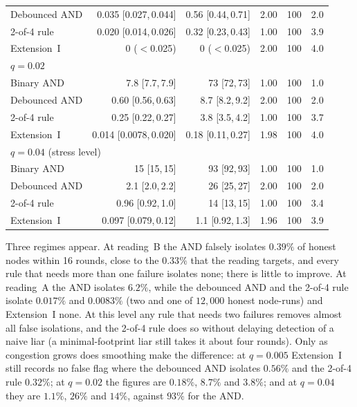 \documentclass[lineno,pdflatex,sn-nature]{sn-jnl}
\theoremstyle{thmstyleone}%
\theoremstyle{thmstylethree}%
\begin{document}
\begin{table}[!t]
\begin{tabular}{lrrrrr}
Debounced AND & 0.035 [0.027,\,0.044] & 0.56 [0.44,\,0.71] & 2.00 & 100 & 2.0 \\
2-of-4 rule & 0.020 [0.014,\,0.026] & 0.32 [0.23,\,0.43] & 1.00 & 100 & 3.9 \\
{Extension~I} & 0 ($<$0.025) & 0 ($<$0.025) & 2.00 & 100 & 4.0 \\
\midrule
\multicolumn{6}{l}{$q=0.02$} \\
Binary AND~\cite{soula2024iodt} & 7.8 [7.7,\,7.9] & 73 [72,\,73] & 1.00 & 100 & 1.0 \\
Debounced AND & 0.60 [0.56,\,0.63] & 8.7 [8.2,\,9.2] & 2.00 & 100 & 2.0 \\
2-of-4 rule & 0.25 [0.22,\,0.27] & 3.8 [3.5,\,4.2] & 1.00 & 100 & 3.7 \\
{Extension~I} & 0.014 [0.0078,\,0.020] & 0.18 [0.11,\,0.27] & 1.98 & 100 & 4.0 \\
\midrule
\multicolumn{6}{l}{$q=0.04$ (stress level)} \\
Binary AND~\cite{soula2024iodt} & 15 [15,\,15] & 93 [92,\,93] & 1.00 & 100 & 1.0 \\
Debounced AND & 2.1 [2.0,\,2.2] & 26 [25,\,27] & 2.00 & 100 & 2.0 \\
2-of-4 rule & 0.96 [0.92,\,1.0] & 14 [13,\,15] & 1.00 & 100 & 3.4 \\
{Extension~I} & 0.097 [0.079,\,0.12] & 1.1 [0.92,\,1.3] & 1.96 & 100 & 3.9 \\
\bottomrule
\end{tabular}
\end{table}

Three regimes appear.  At reading~B the AND falsely isolates $0.39\%$
of honest nodes within 16 rounds, close to the $0.33\%$ that the
reading targets, and every rule that needs more than one failure
isolates none; there is little to improve.  At reading~A the AND
isolates $6.2\%$, while the debounced AND and the 2-of-4 rule isolate
$0.017\%$ and $0.0083\%$ (two and one of $12{,}000$ honest node-runs)
and Extension~I none.  At this level any rule that needs two failures
removes almost all false isolations, and the 2-of-4 rule does so
without delaying detection of a naive liar (a minimal-footprint liar
still takes it about four rounds).  Only as congestion grows does smoothing
make the difference: at $q=0.005$ Extension~I still records no false
flag where the debounced AND isolates $0.56\%$ and the 2-of-4 rule
$0.32\%$; at $q=0.02$ the figures are $0.18\%$, $8.7\%$ and $3.8\%$;
and at $q=0.04$ they are $1.1\%$, $26\%$ and $14\%$, against $93\%$
for the AND.
\end{document}
